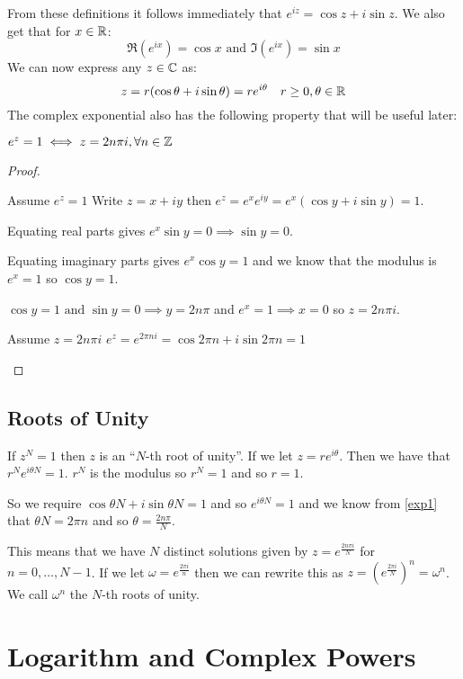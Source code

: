 \documentclass[../main.tex]{subfiles}
\begin{document}
From these definitions it follows immediately that $e^{iz} = \cos z + i\sin z$.
We also get that for $x \in \mathbb{R}$:
\[
  \Re(e^{ix}) = \cos x \text{ and } \Im(e^{ix}) = \sin x
\]
We can now express any $z \in \mathbb{C}$ as:
\[
  z = r(\cos \theta + i\sin\theta) = re^{i\theta}\quad r \geq 0, \theta \in \mathbb{R}
\]
The complex exponential also has the following property that will be useful later:
\begin{lemma}
  $e^{z} = 1 \iff z = 2n \pi i, \forall n \in \mathbb{Z}$
  \label{exp1}
\end{lemma}
\begin{proof}
  \begin{proofdirection}{Assume $e^{z} = 1$}
    Write $z = x + iy$ then $e^{z} = e^{x} e^{iy} = e^{x} (\cos y + i \sin y) = 1$.

    Equating real parts gives $e^{x} \sin y = 0 \implies \sin y = 0$.

    Equating imaginary parts gives $e^{x} \cos y = 1$ and we know that the modulus is $e^{x} = 1$ so $\cos y = 1$.

    $\cos y = 1 \text{ and } \sin y = 0 \implies y = 2n\pi$ and $e^{x} = 1 \implies x = 0$ so $z = 2n\pi i$.
  \end{proofdirection}
  \begin{proofdirection}{Assume $z = 2n \pi i$}
    $e^{z} = e^{2 \pi n i} = \cos 2 \pi n + i \sin 2 \pi n = 1$
  \end{proofdirection}
\end{proof}
\subsection{Roots of Unity}
If $z^{N} = 1$ then $z$ is an ``$N$-th root of unity''.
If we let $z = re^{i\theta}$.
Then we have that $r^{N}e^{i \theta N} = 1$.
$r^{N}$ is the modulus so $r^{N} = 1$ and so $r = 1$.

So we require $\cos \theta N + i \sin \theta N = 1$ and so $e^{i \theta N} = 1$ and we know from \cref{exp1} that $\theta N = 2 \pi n$ and so $\theta = \frac{2n \pi}{N}$.

This means that we have $N$ distinct solutions given by $z = e^{\frac{2 n \pi i}{N}}$ for $n = 0, \ldots, N - 1$.
If we let $\omega = e^{\frac{2 \pi i}{n}}$ then we can rewrite this as $z = (e^{\frac{2 \pi i}{N}})^{n} = \omega^{n}$.
We call $\omega^{n}$ the $N$-th roots of unity.
\section{Logarithm and Complex Powers}
\end{document}
